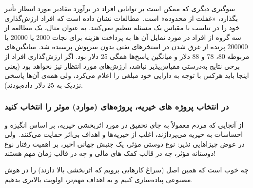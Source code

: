 سوگیری دیگری که ممکن است بر توانایی افراد در برآورد مقادیر مورد انتظار تأثیر بگذارد، «غفلت از محدوده» است.\     مطالعات نشان داده است که افراد ارزش‌گذاری خود را در تناسب با مقیاس یک مسئله تنظیم نمی‌کنند.
به عنوان مثال، یک مطالعه از سه گروه از افراد در مورد تمایل آن ها به پرداخت هزینه برای نجات 2000 یا 20000 یا 200000 پرنده از غرق شدن در استخرهای نفتی بدون سرپوش پرسیده شد.
میانگین‌های مربوطه 80، 78 و 88 دلار و میانگین پاسخ‌ها همگی 25 دلار بود.
اگر ارزش‌گذاری افراد از برخی نتایج به‌درستی مقیاس‌پذیر نباشد، ارزش‌های مورد انتظار نیز نخواهد بود (یعنی اینجا باید هرکس با توجه به دارایی خود مبلغی را اعلام می‌کرد، ولی همه‌ی آن‌ها پاسخی نزدیک به 25 دلار داده‌بودند).


\subsubsection*{در انتخاب پروژه های خیریه، پروژه‌های (موارد) موثر را انتخاب کنید}
از آنجایی که مردم معمولاً به جای تحقیق در مورد اثربخشی خیریه، بر اساس انگیزه و احساسات به خیریه می‌پردازند، اغلب از خیریه‌ها و اهداف بی‌اثر حمایت می‌کنند.\     ولی در عوض چیزاهایی نذیر: نوع دوستی مؤثر، یک جنبش جهانی اخیر، بر اهمیت رفتار نوع دوستانه مؤثر، چه در قالب کمک های مالی و چه در قالب زمان مهم هستند!

چه خوب است که همین اصل (سراغ کارهایی برویم که اثربخشی بالا دارند) را در هوش مصنوعی پیاده‌سازی کنیم و به اهداف مهم‌تر، اولویت بالاتری بدهیم.





\backmatter